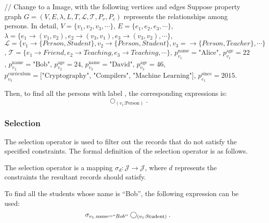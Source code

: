 \begin{example}
    // Change to a Image, with the following vertices and edges 
    Suppose property graph $G = (V, E, \lambda, L, T, \mathcal{L}, \mathcal{T}, P_v, P_e)$ represents the relationships among persons.
    In detail, $V = \{v_1, v_2, v_3, \cdots\}$, $E = \{e_1, e_2, e_3, \cdots\}$, $\lambda = \{e_1 \rightarrow (v_1, v_2), e_2 \rightarrow (v_3, v_1), e_3 \rightarrow (v_3, v_2), \cdots\}$, $\mathcal{L} = \{v_1 \rightarrow \{Person, Student\}, v_2 \rightarrow \{Person, Student\}, v_3 = \rightarrow \{Person, Teacher\}, \cdots\}$, $\mathcal{T} = \{e_1 \rightarrow Friend, e_2 \rightarrow Teaching, e_3 \rightarrow Teaching, \cdots\}$, $p_{v_1}^{\text{name}} = \text{"Alice"}$, $p_{v_1}^{\text{age}} = \text{22}$, $p_{v_2}^{\text{name}} = \text{"Bob"}$, $p_{v_2}^{\text{age}} = \text{24}$, $p_{v_3}^{\text{name}} = \text{"David"}$, $p_{v_3}^{\text{age}} = \text{46}$, $p_{v_3}^{\text{curriculum}} = [\text{"Cryptography"}$, $\text{"Compilers"}$, $\text{"Machine Learning"}]$, $p_{e_1}^{\text{since}} = \text{2015}$. 

    Then, to find all the persons with label , the corresponding expressions is:
    \begin{equation*}
        \bigcirc_{(v_1\text{:Person})}.
    \end{equation*}
\end{example}


\subsubsection{Selection}

The selection operator is used to filter out the records that do not satisfy the specified constraints.
The formal definition of the selection operator is as follows.

\begin{definition}
    The selection operator is a mapping $\sigma_d : \mathcal{J} \rightarrow \mathcal{J}$, where $d$ represents the constraints the resultant records should satisfy.
\end{definition}

\begin{example}
    To find all the students whose name is ``Bob'', the following expression can be used:
    \begin{equation*}
        \sigma_{v_1.\text{name} = ``Bob''}\bigcirc_{(v_1\text{:Student})}.
    \end{equation*}
\end{example}

